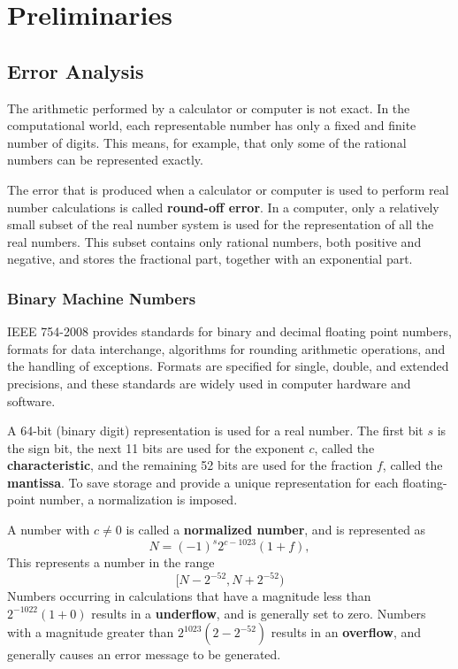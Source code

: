 \documentclass[../main.tex]{subfiles}
\begin{document}
\chapter{Preliminaries}

\section{Error Analysis}
The arithmetic performed by a calculator or computer is not exact. In the computational world, each representable number has only a fixed and finite number of digits. This means, for example, that only some of the rational numbers can be represented exactly.

The error that is produced when a calculator or computer is used to perform real number calculations is called \textbf{round-off error}. In a computer, only a relatively small subset of the real number system is used for the representation of all the real numbers. This subset contains only rational numbers, both positive and negative, and stores the fractional part, together with an exponential part.

\subsection{Binary Machine Numbers}
IEEE 754-2008 provides standards for binary and decimal floating point numbers, formats for data interchange, algorithms for rounding arithmetic operations, and the handling of exceptions. Formats are specified for single, double, and extended precisions, and these standards are widely used in computer hardware and software.

A 64-bit (binary digit) representation is used for a real number. The first bit $s$ is the sign bit, the next 11 bits are used for the exponent $c$, called the \textbf{characteristic}, and the remaining 52 bits are used for the fraction $f$, called the \textbf{mantissa}. To save storage and provide a unique representation for each floating-point number, a normalization is imposed.

A number with $c \neq 0$ is called a \textbf{normalized number}, and is represented as
\begin{equation}
  N = (-1)^s 2^{c-1023} (1 + f),
\end{equation}
This represents a number in the range
\begin{equation*}
  [N - 2^{-52}, N + 2^{-52})
\end{equation*}
Numbers occurring in calculations that have a magnitude less than $2^{-1022}(1+0)$ results in a \textbf{underflow}, and is generally set to zero. Numbers with a magnitude greater than $2^{1023}(2-2^{-52})$ results in an \textbf{overflow}, and generally causes an error message to be generated.
\end{document}
